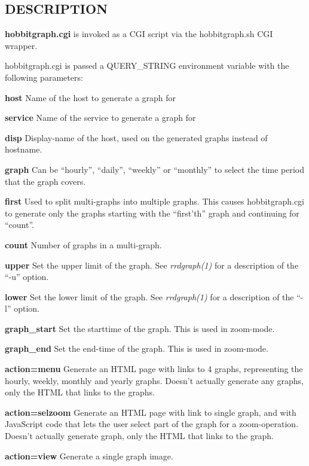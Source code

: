  
\subsection{DESCRIPTION}
\textbf{hobbitgraph.cgi}
 is invoked as a CGI script via the hobbitgraph.sh CGI wrapper. 

  hobbitgraph.cgi is passed a QUERY\_STRING environment variable with the following parameters: 


 \textbf{host}
 Name of the host to generate a graph for 


 \textbf{service}
 Name of the service to generate a graph for 


 \textbf{disp}
 Display-name of the host, used on the generated graphs instead of hostname. 


 \textbf{graph}
 Can be ``hourly'', ``daily'', ``weekly'' or ``monthly'' to select the time period that the graph covers. 


 \textbf{first}
 Used to split multi-graphs into multiple graphs. This causes hobbitgraph.cgi to generate only the graphs starting with the ``first'th'' graph and continuing for ``count''. 


 \textbf{count}
 Number of graphs in a multi-graph. 


 \textbf{upper}
 Set the upper limit of the graph. See \emph{rrdgraph(1)}
 for a description of the ``-u'' option. 


 \textbf{lower}
 Set the lower limit of the graph. See \emph{rrdgraph(1)}
 for a description of the ``-l'' option. 


 \textbf{graph\_start}
 Set the starttime of the graph. This is used in zoom-mode. 


 \textbf{graph\_end}
 Set the end-time of the graph. This is used in zoom-mode. 


 \textbf{action=menu}
 Generate an HTML page with links to 4 graphs, representing the hourly, weekly, monthly and yearly graphs. Doesn't actually generate any graphs, only the HTML that links to the graphs. 


 \textbf{action=selzoom}
 Generate an HTML page with link to single graph, and with JavaScript code that lets the user select part of the graph for a zoom-operation. Doesn't actually generate graph, only the HTML that links to the graph. 


 \textbf{action=view}
 Generate a single graph image. 


 
